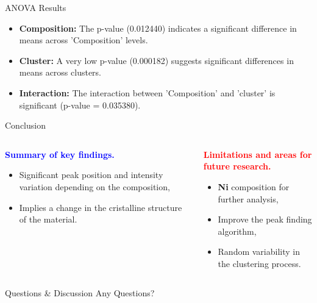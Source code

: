 \documentclass[aspectratio=169]{beamer}
\begin{document}
\begin{frame}[fragile]{ANOVA Results}
    \begin{itemize}
        \item \textbf{Composition:} The p-value (0.012440) indicates a significant difference in means across 'Composition' levels.
        \item \textbf{Cluster:} A very low p-value (0.000182) suggests significant differences in means across clusters.
        \item \textbf{Interaction:} The interaction between 'Composition' and 'cluster' is significant (p-value = 0.035380).
    \end{itemize}
\end{frame}




\begin{frame}{Conclusion}
  \begin{columns}
    \begin{column}{0.5\textwidth}
      \centering
      \textbf{\textcolor{blue}{Summary of key findings.}}
      \begin{itemize}
        \item Significant peak position and intensity variation depending on the composition,
        \item Implies a change in the cristalline structure of the material. 
      \end{itemize}
    \end{column}
    
    \begin{column}{0.5\textwidth}
      \centering
      \textbf{\textcolor{red}{Limitations and areas for future research.}}
      \begin{itemize}
        \item \textbf{Ni} composition for further analysis,
        \item Improve the peak finding algorithm,
        \item Random variability in the clustering process.
      \end{itemize}
    \end{column}
  \end{columns}
\end{frame}



\begin{frame}{Questions \& Discussion}
    \centering
    \Huge Any Questions?
\end{frame}
\end{document}
